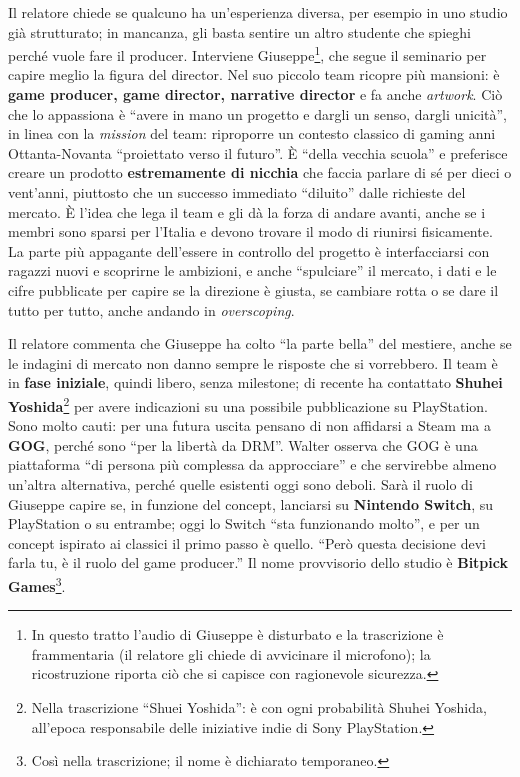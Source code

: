 Il relatore chiede se qualcuno ha un'esperienza diversa, per esempio in uno
studio già strutturato; in mancanza, gli basta sentire un altro studente che
spieghi perché vuole fare il producer. Interviene Giuseppe\footnote{In questo
tratto l'audio di Giuseppe è disturbato e la trascrizione è frammentaria
(il relatore gli chiede di avvicinare il microfono); la ricostruzione riporta
ciò che si capisce con ragionevole sicurezza.}, che segue il seminario per
capire meglio la figura del director. Nel suo piccolo team ricopre più mansioni:
è \textbf{game producer, game director, narrative director} e fa anche
\emph{artwork}. Ciò che lo appassiona è ``avere in mano un progetto e dargli un
senso, dargli unicità'', in linea con la \emph{mission} del team: riproporre un
contesto classico di gaming anni Ottanta-Novanta ``proiettato verso il
futuro''. È ``della vecchia scuola'' e preferisce creare un prodotto
\textbf{estremamente di nicchia} che faccia parlare di sé per dieci o vent'anni,
piuttosto che un successo immediato ``diluito'' dalle richieste del mercato. È
l'idea che lega il team e gli dà la forza di andare avanti, anche se i membri
sono sparsi per l'Italia e devono trovare il modo di riunirsi fisicamente. La
parte più appagante dell'essere in controllo del progetto è interfacciarsi con
ragazzi nuovi e scoprirne le ambizioni, e anche ``spulciare'' il mercato, i dati
e le cifre pubblicate per capire se la direzione è giusta, se cambiare rotta o se
dare il tutto per tutto, anche andando in \emph{overscoping}.

Il relatore commenta che Giuseppe ha colto ``la parte bella'' del mestiere,
anche se le indagini di mercato non danno sempre le risposte che si vorrebbero.
Il team è in \textbf{fase iniziale}, quindi libero, senza milestone; di recente
ha contattato \textbf{Shuhei Yoshida}\footnote{Nella trascrizione ``Shuei
Yoshida'': è con ogni probabilità Shuhei Yoshida, all'epoca responsabile delle
iniziative indie di Sony PlayStation.} per avere indicazioni su una possibile
pubblicazione su PlayStation. Sono molto cauti: per una futura uscita pensano di
non affidarsi a Steam ma a \textbf{GOG}, perché sono ``per la libertà da DRM''.
Walter osserva che GOG è una piattaforma ``di persona più complessa da
approcciare'' e che servirebbe almeno un'altra alternativa, perché quelle
esistenti oggi sono deboli. Sarà il ruolo di Giuseppe capire se, in funzione
del concept, lanciarsi su \textbf{Nintendo Switch}, su PlayStation o su
entrambe; oggi lo Switch ``sta funzionando molto'', e per un concept ispirato ai
classici il primo passo è quello. ``Però questa decisione devi farla tu, è il
ruolo del game producer.'' Il nome provvisorio dello studio è \textbf{Bitpick
Games}\footnote{Così nella trascrizione; il nome è dichiarato temporaneo.}.

